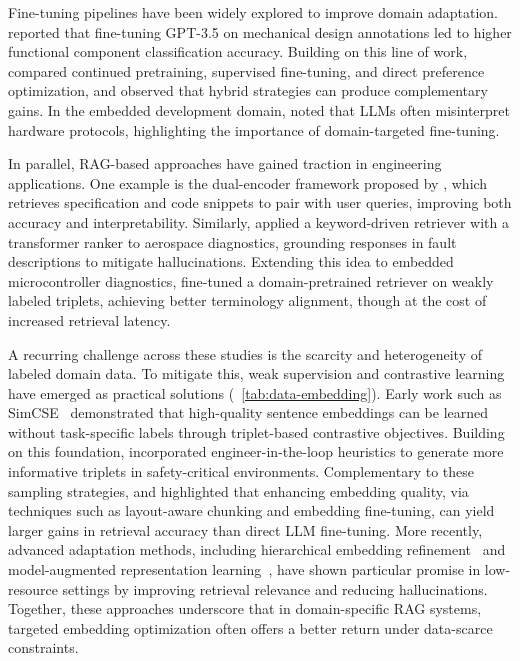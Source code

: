 \documentclass[a4paper,fleqn]{cas-dc}
\begin{document}
Fine-tuning pipelines have been widely explored to improve domain adaptation. \cite{elhambakhsh2025domain} reported that fine-tuning GPT-3.5 on mechanical design annotations led to higher functional component classification accuracy. Building on this line of work, \cite{lu2025fine} compared continued pretraining, supervised fine-tuning, and direct preference optimization, and observed that hybrid strategies can produce complementary gains. In the embedded development domain, \cite{englhardt2024exploring} noted that LLMs often misinterpret hardware protocols, highlighting the importance of domain-targeted fine-tuning.

In parallel, RAG-based approaches have gained traction in engineering applications. One example is the dual-encoder framework proposed by \cite{ZHANG2023110264}, which retrieves specification and code snippets to pair with user queries, improving both accuracy and interpretability. Similarly, \cite{hu2024rag} applied a keyword-driven retriever with a transformer ranker to aerospace diagnostics, grounding responses in fault descriptions to mitigate hallucinations. Extending this idea to embedded microcontroller diagnostics, \cite{yu2025finemedlm} fine-tuned a domain-pretrained retriever on weakly labeled triplets, achieving better terminology alignment, though at the cost of increased retrieval latency.

A recurring challenge across these studies is the scarcity and heterogeneity of labeled domain data. To mitigate this, weak supervision and contrastive learning have emerged as practical solutions (\tablename~\ref{tab:data-embedding}). Early work such as SimCSE~\cite{gao2021simcse} demonstrated that high-quality sentence embeddings can be learned without task-specific labels through triplet-based contrastive objectives. Building on this foundation, \cite{yang2024rethinking} incorporated engineer-in-the-loop heuristics to generate more informative triplets in safety-critical environments. Complementary to these sampling strategies, \cite{liu2024optimizing} and \cite{nguyen2024enhancing} highlighted that enhancing embedding quality, via techniques such as layout-aware chunking and embedding fine-tuning, can yield larger gains in retrieval accuracy than direct LLM fine-tuning. More recently, advanced adaptation methods, including hierarchical embedding refinement~\cite{zhou2025representation} and model-augmented representation learning~\cite{zhang2025hallucination}, have shown particular promise in low-resource settings by improving retrieval relevance and reducing hallucinations. Together, these approaches underscore that in domain-specific RAG systems, targeted embedding optimization often offers a better return under data-scarce constraints.
\end{document}
